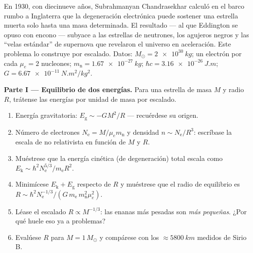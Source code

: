 \begin{problem}\label{pb:b3:quantum-statistics:1}
En 1930, con diecinueve años, Subrahmanyan Chandrasekhar calculó en el
barco rumbo a Inglaterra que la degeneración electrónica puede sostener una
estrella muerta solo hasta una masa determinada. El resultado --- al que
Eddington se opuso con encono --- subyace a las estrellas de neutrones, los
agujeros negros y las ``velas estándar'' de supernova que revelaron el
universo en aceleración. Este problema lo construye por escalado. Datos: $M_\odot =
\qty{2e30}{kg}$; un electrón por cada $\mu_e = 2$ nucleones; $m_{\text{
n}} = \qty{1.67e-27}{kg}$; $\hbar c = \qty{3.16e-26}{J.m}$; $G =
\qty{6.67e-11}{N.m^2/kg^2}$.

\medskip\noindent\textbf{Parte I --- Equilibrio de dos energías.}
Para una estrella de masa $M$ y radio $R$, trátense las energías por unidad
de masa por escalado.
\begin{enumerate}
  \item Energía gravitatoria: $E_{\text{g}} \sim -GM^2/R$ ---
        recuérdese su origen.
  \item Número de electrones $N_{\text{e}} = M/\mu_e m_{\text{n}}$ y
        densidad $n \sim N_{\text{e}}/R^3$: escríbase la
        escala de  no relativista en función de $M$
        y $R$.
  \item Muéstrese que la energía cinética (de degeneración) total escala como
        $E_{\text{k}} \sim \hbar^2N_{\text{e}}^{5/3}/m_{\text{e}}
        R^2$.
  \item Minimícese $E_{\text{k}} + E_{\text{g}}$ respecto de $R$ y muéstrese
        que el radio de equilibrio es
        $R \sim \hbar^2 N_{\text{e}}^{-1/3}/(G\,m_{\text{e}}\,
        m_{\text{n}}^2\mu_e^2)$.
  \item Léase el escalado $R \propto M^{-1/3}$: las enanas más pesadas
        son \emph{más pequeñas}. ¿Por qué huele eso ya a
        problemas?
  \item Evalúese $R$ para $M = 1\,M_\odot$ y compárese con los
        $\approx\qty{5800}{km}$ medidos de Sirio B.
\end{enumerate}


\end{problem}
